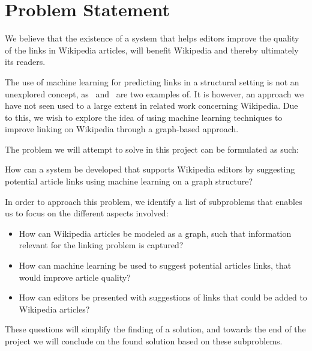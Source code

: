 \section{Problem Statement}\label{sec:problem_statement}
We believe that the existence of a system that helps editors improve the quality of the links in Wikipedia articles, will benefit Wikipedia and thereby ultimately its readers.

The use of machine learning for predicting links in a structural setting is not an unexplored concept, as~\cite{tang2015line} and~\cite{al2006link} are two examples of. It is however, an approach we have not seen used to a large extent in related work concerning Wikipedia. Due to this, we wish to explore the idea of using machine learning techniques to improve linking on Wikipedia through a graph-based approach.

The problem we will attempt to solve in this project can be formulated as such:
\vspace{1ex} %
\begin{formal}
How can a system be developed that supports Wikipedia editors by suggesting potential article links using machine learning on a graph structure?
\end{formal}

In order to approach this problem, we identify a list of subproblems that enables us to focus on the different aspects involved:

\newcommand{\subproblems}{
\begin{itemize}
  \item How can Wikipedia articles be modeled as a graph, such that information relevant for the linking problem is captured?
  \item How can machine learning be used to suggest potential articles links, that would improve article quality?
  \item How can editors be presented with suggestions of links that could be added to Wikipedia articles?
\end{itemize}}

\subproblems

These questions will simplify the finding of a solution, and towards the end of the project we will conclude on the found solution based on these subproblems.

